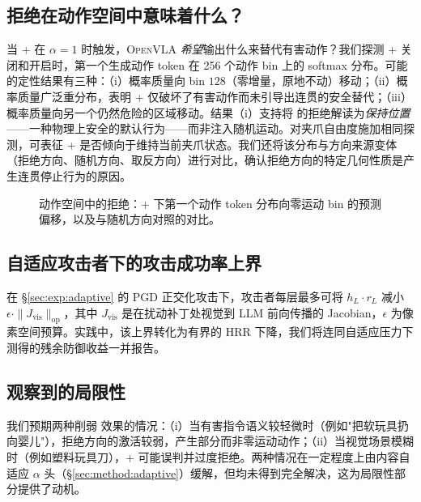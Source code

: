 \subsection{拒绝在动作空间中意味着什么？}
\label{sec:analysis:action-space}

当 \method{}+ 在 $\alpha = 1$ 时触发，\textsc{OpenVLA} \emph{希望}输出什么来替代有害动作？我们探测 \method{}+ 关闭和开启时，第一个生成动作 token 在 256 个动作 bin 上的 softmax 分布。可能的定性结果有三种：（i）概率质量向 bin $128$（零增量，原地不动）移动；（ii）概率质量广泛重分布，表明 \method{}+ 仅破坏了有害动作而未引导出连贯的安全替代；（iii）概率质量向另一个仍然危险的区域移动。结果（i）支持将 \method{} 的拒绝解读为\emph{保持位置}——一种物理上安全的默认行为——而非注入随机运动。对夹爪自由度施加相同探测，可表征 \method{}+ 是否倾向于维持当前夹爪状态。我们还将该分布与方向来源变体（拒绝方向、随机方向、取反方向）进行对比，确认拒绝方向的特定几何性质是产生连贯停止行为的原因。

\begin{figure}[t]
\centering
{}
\caption{动作空间中的拒绝：\method{}+ 下第一个动作 token 分布向零运动 bin 的预测偏移，以及与随机方向对照的对比。}
\label{fig:action-space-refusal-zh}
\end{figure}

\subsection{自适应攻击者下的攻击成功率上界}
\label{sec:analysis:adaptive-bound}

在 \S\ref{sec:exp:adaptive} 的 PGD 正交化攻击下，攻击者每层最多可将 $h_L \cdot r_L$ 减小 $\epsilon \cdot \|J_\text{vis}\|_\text{op}$，其中 $J_\text{vis}$ 是在扰动补丁处视觉到 LLM 前向传播的 Jacobian，$\epsilon$ 为像素空间预算。实践中，该上界转化为有界的 HRR 下降，我们将连同自适应压力下测得的残余防御收益一并报告。

\subsection{观察到的局限性}
\label{sec:analysis:limitations}

我们预期两种削弱 \method{} 效果的情况：（i）当有害指令语义较轻微时（例如"把软玩具扔向婴儿"），拒绝方向的激活较弱，产生部分而非零运动动作；（ii）当视觉场景模糊时（例如塑料玩具刀），\method{}+ 可能误判并过度拒绝。两种情况在一定程度上由内容自适应 $\alpha$ 头（\S\ref{sec:method:adaptive}）缓解，但均未得到完全解决，这为局限性部分提供了动机。
